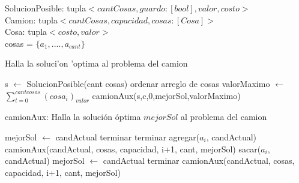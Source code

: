 \noindent
SolucionPosible: tupla$<cantCosas, guardo:[bool], valor, costo>$ \\
Camion: tupla$<cantCosas, capacidad, cosas: [Cosa]>$ \\
Cosa: tupla$<costo, valor>$ \\
cosas = $\{a_1,....,a_{cant}\}$ \\

\begin{algorithm}
\caption{Halla la soluci'on 'optima al problema del camion}
\begin{algorithmic}[1]
    \STATE s $\leftarrow$ SolucionPosible(cant cosas)
    \STATE ordenar arreglo de cosas 
    \STATE valorMaximo $\leftarrow$ $\sum_{t=0}^{cant cosas} (cosa_i)_{valor}$ 
    \STATE camionAux(s,c,0,mejorSol,valorMaximo)
\end{algorithmic}
\end{algorithm}

\begin{algorithm}
\caption{camionAux: Halla la solución óptima $mejorSol$ al problema del camion}
\begin{algorithmic}[1]
        \STATE mejorSol $\leftarrow$ candActual
        \STATE terminar
    \ENDIF    
        \STATE terminar
    \ELSE
                    \STATE agregar($a_i$, candActual)
                    \STATE camionAux(candActual, cosas, capacidad, i+1, cant, mejorSol)
                    \STATE sacar($a_i$, candActual)
            		\ELSE
            								\STATE {}
       											  	\STATE mejorSol $\leftarrow$ candActual
        										\ENDIF	       
        										\STATE terminar
        				\ENDIF
         \STATE camionAux(candActual, cosas, capacidad, i+1, cant, mejorSol)
    \ENDIF
   \ENDIF
\end{algorithmic}
\end{algorithm}